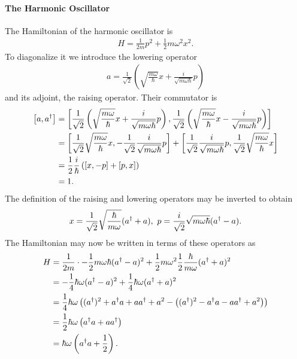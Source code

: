 \paragraph{The Harmonic Oscillator}
The Hamiltonian of the harmonic oscillator is
\begin{align*}
	H = \frac{1}{2m}p^{2} + \frac{1}{2}m\omega^{2}x^{2}.
\end{align*}
To diagonalize it we introduce the lowering operator
\begin{align*}
	a = \frac{1}{\sqrt{2}}\left(\sqrt{\frac{m\omega}{\hbar}}x + \frac{i}{\sqrt{m\omega\hbar}}p\right)
\end{align*}
and its adjoint, the raising operator. Their commutator is
\begin{align*}
	\comm{a}{\adj{a}} &= \comm{\frac{1}{\sqrt{2}}\left(\sqrt{\frac{m\omega}{\hbar}}x + \frac{i}{\sqrt{m\omega\hbar}}p\right)}{\frac{1}{\sqrt{2}}\left(\sqrt{\frac{m\omega}{\hbar}}x - \frac{i}{\sqrt{m\omega\hbar}}p\right)} \\
	                  &= \comm{\frac{1}{\sqrt{2}}\sqrt{\frac{m\omega}{\hbar}}x}{-\frac{1}{\sqrt{2}}\frac{i}{\sqrt{m\omega\hbar}}p} + \comm{\frac{1}{\sqrt{2}}\frac{i}{\sqrt{m\omega\hbar}}p}{\frac{1}{\sqrt{2}}\sqrt{\frac{m\omega}{\hbar}}x} \\
	                  &= \frac{1}{2}\frac{i}{\hbar}\left(\comm{x}{-p} + \comm{p}{x}\right) \\
	                  &= 1.
\end{align*}
The definition of the raising and lowering operators may be inverted to obtain
\begin{align*}
	x = \frac{1}{\sqrt{2}}\sqrt{\frac{\hbar}{m\omega}}(a^{\dagger} + a),\ p = \frac{i}{\sqrt{2}}\sqrt{m\omega\hbar}(a^{\dagger} - a).
\end{align*}
The Hamiltonian may now be written in terms of these operators as
\begin{align*}
	H &= \frac{1}{2m}\cdot -\frac{1}{2}m\omega\hbar(a^{\dagger} - a)^{2} + \frac{1}{2}m\omega^{2}\frac{1}{2}\frac{\hbar}{m\omega}(a^{\dagger} + a)^{2} \\
	  &= -\frac{1}{4}\hbar\omega(a^{\dagger} - a)^{2} + \frac{1}{4}\hbar\omega(a^{\dagger} + a)^{2} \\
	  &= \frac{1}{4}\hbar\omega\left((a^{\dagger})^{2} + a^{\dagger}a + aa^{\dagger} + a^{2} - \left((a^{\dagger})^{2} - a^{\dagger}a - aa^{\dagger} + a^{2}\right)\right) \\
	  &= \frac{1}{2}\hbar\omega\left(a^{\dagger}a + aa^{\dagger}\right) \\
	  &= \hbar\omega\left(a^{\dagger}a + \frac{1}{2}\right).
\end{align*}

